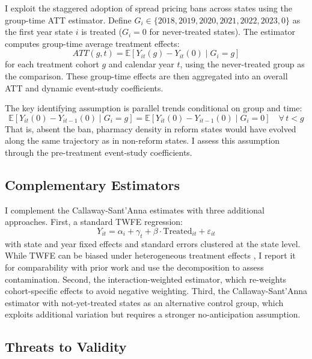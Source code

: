 \documentclass[12pt]{article}
\newcommand{\E}{\mathbb{E}}
\begin{document}
I exploit the staggered adoption of spread pricing bans across states using the \citet{callaway2021difference} group-time ATT estimator. Define $G_i \in \{2018, 2019, 2020, 2021, 2022, 2023, 0\}$ as the first year state $i$ is treated ($G_i = 0$ for never-treated states). The estimator computes group-time average treatment effects:
\begin{equation}
ATT(g,t) = \E[Y_{it}(g) - Y_{it}(0) \mid G_i = g]
\end{equation}
for each treatment cohort $g$ and calendar year $t$, using the never-treated group as the comparison. These group-time effects are then aggregated into an overall ATT and dynamic event-study coefficients.

The key identifying assumption is parallel trends conditional on group and time:
\begin{equation}
\E[Y_{it}(0) - Y_{it-1}(0) \mid G_i = g] = \E[Y_{it}(0) - Y_{it-1}(0) \mid G_i = 0] \quad \forall\, t < g
\end{equation}
That is, absent the ban, pharmacy density in reform states would have evolved along the same trajectory as in non-reform states. I assess this assumption through the pre-treatment event-study coefficients.

\subsection{Complementary Estimators}

I complement the Callaway-Sant'Anna estimates with three additional approaches. First, a standard TWFE regression:
\begin{equation}
Y_{it} = \alpha_i + \gamma_t + \beta \cdot \text{Treated}_{it} + \varepsilon_{it}
\end{equation}
with state and year fixed effects and standard errors clustered at the state level. While TWFE can be biased under heterogeneous treatment effects \citep{goodman2021difference, dechaisemartin2020two}, I report it for comparability with prior work and use the \citet{goodman2021difference} decomposition to assess contamination. Second, the \citet{sun2021estimating} interaction-weighted estimator, which re-weights cohort-specific effects to avoid negative weighting. Third, the Callaway-Sant'Anna estimator with not-yet-treated states as an alternative control group, which exploits additional variation but requires a stronger no-anticipation assumption.

\subsection{Threats to Validity}
\end{document}

